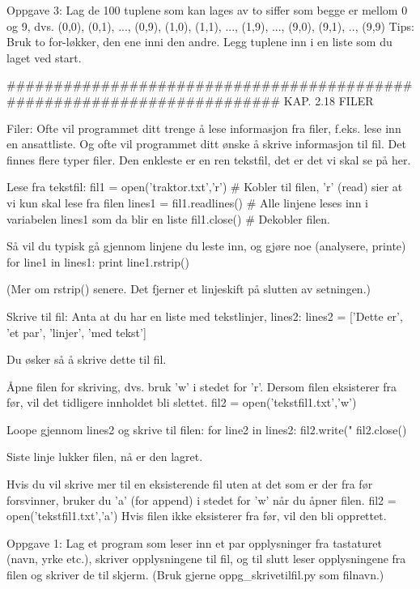 {Oppgave 3: Lag de 100 tuplene som kan lages av to siffer som begge er mellom 0 og 9,
dvs. (0,0), (0,1), ..., (0,9), (1,0), (1,1), ..., (1,9), ..., (9,0), (9,1), .., (9,9)
Tips: Bruk to for-løkker, den ene inni den andre. 
Legg tuplene inn i en liste som du laget ved start.

######################################################################## 
KAP. 2.18  FILER 

Filer:
Ofte vil programmet ditt trenge å lese informasjon fra filer, 
f.eks. lese inn en ansattliste.
Og ofte vil programmet ditt ønske å skrive informasjon til fil. 
Det finnes flere typer filer. 
Den enkleste er en ren tekstfil, det er det vi skal se på her. 

Lese fra tekstfil:
fil1 = open('traktor.txt','r')    # Kobler til filen, 'r' (read) sier at vi kun skal lese fra filen
lines1 = fil1.readlines()         # Alle linjene leses inn i variabelen lines1 som da blir en liste
fil1.close()                      # Dekobler filen. 

Så vil du typisk gå gjennom linjene du leste inn, og gjøre noe (analysere, printe)
for line1 in lines1:
    print line1.rstrip()          

(Mer om rstrip() senere. Det fjerner et linjeskift på slutten av setningen.)


Skrive til fil: 
Anta at du har en liste med tekstlinjer, lines2: 
lines2 = ['Dette er', 'et par', 'linjer', 'med tekst']

Du øsker så å skrive dette til fil.

Åpne filen for skriving, dvs. bruk 'w' i stedet for 'r'. 
Dersom filen eksisterer fra før, vil det tidligere innholdet bli slettet.
fil2 = open('tekstfil1.txt','w')    

Loope gjennom lines2 og skrive til filen:
for line2 in lines2:
    fil2.write("%
fil2.close()                        

Siste linje lukker filen, nå er den lagret. 

Hvis du vil skrive mer til en eksisterende fil uten at det som er der fra før forsvinner,
bruker du 'a' (for append) i stedet for 'w' når du åpner filen.
fil2 = open('tekstfil1.txt','a')
Hvis filen ikke eksisterer fra før, vil den bli opprettet. 

 

Oppgave 1: Lag et program som leser inn et par opplysninger fra tastaturet 
(navn, yrke etc.), skriver opplysningene til fil, og til slutt leser 
opplysningene fra filen og skriver de til skjerm.
(Bruk gjerne oppg_skrivetilfil.py som filnavn.)


}
